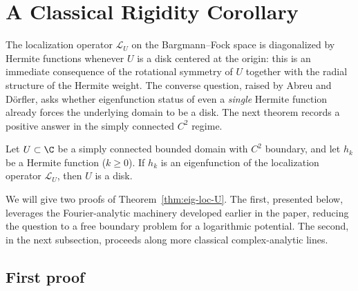 \section{A Classical Rigidity Corollary}\label{sec:classical-rigidity}

The localization operator $\mathcal{L}_U$ on the Bargmann--Fock space is
diagonalized by Hermite functions whenever $U$ is a disk centered at the
origin: this is an immediate consequence of the rotational symmetry of $U$
together with the radial structure of the Hermite weight. The converse
question, raised by Abreu and D\"orfler, asks whether eigenfunction status of
even a \emph{single} Hermite function already forces the underlying domain to
be a disk. The next theorem records a positive answer in the simply connected
$C^2$ regime.

\begin{theorem}\label{thm:eig-loc-U}
Let $U\subset \C$ be a simply connected bounded domain with $C^2$ boundary,
and let $h_k$ be a Hermite function ($k\ge 0$). If $h_k$ is an eigenfunction
of the localization operator $\mathcal{L}_U$, then $U$ is a disk.
\end{theorem}

We will give two proofs of Theorem~\ref{thm:eig-loc-U}. The first, presented
below, leverages the Fourier-analytic machinery developed earlier in the
paper, reducing the question to a free boundary problem for a logarithmic
potential. The second, in the next subsection, proceeds along more
classical complex-analytic lines.

\subsection{First proof}

